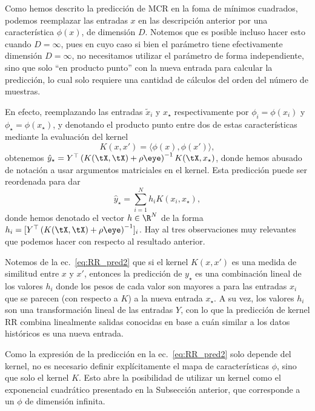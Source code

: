 \begin{remark}
Como hemos descrito la predicción de MCR en la foma de mínimos cuadrados, podemos reemplazar las entradas $x$ en las descripción anterior por una característica $\phi(x)$, de dimensión $D$. Notemos que es posible incluso hacer esto cuando $D=\infty$, pues en cuyo caso si bien el parámetro tiene efectivamente dimensión $D=\infty$, no necesitamos utilizar el parámetro de forma independiente, sino que solo ``en producto punto'' con la nueva entrada para calcular la predicción, lo cual solo requiere una cantidad de cálculos del orden del número de muestras. 
\end{remark}

En efecto, reemplazando las entradas $\tilde{x}_i$ y $x_\star$ respectivamente por $\phi_i=\phi(x_i)$ y $\phi_\star = \phi(x_\star)$, y denotando el producto punto entre dos de estas características mediante la evaluación del kernel 
\begin{equation}
    K(x,x') = \langle \phi(x) , \phi(x') \rangle, 
\end{equation}
obtenemos $\hat{y}_\star    = Y^\top \left(K(\tX,\tX) + \rho\eye\right) ^{-1} K(\tX, x_\star)$, donde hemos abusado de notación a usar argumentos matriciales en el kernel. Esta predicción puede ser reordenada para dar 
\begin{equation}
   \hat{y}_\star    = \sum_{i=1}^N h_i K(x_i,x_\star)\label{eq:RR_pred2},
\end{equation}
donde hemos denotado el vector $h\in\R^N$ de la forma $h_i = [Y^\top \left(K(\tX,\tX) + \rho\eye\right) ^{-1}]_i$. Hay al tres observaciones muy relevantes que podemos hacer con respecto al resultado anterior. 

\begin{remark}[Similitud]
    Notemos de la ec.~\eqref{eq:RR_pred2} que si el kernel $K(x,x')$ es una medida de similitud entre $x$ y $x'$, entonces la predicción de $y_\star$ es una combinación lineal de los valores $h_i$ donde los pesos de cada valor son mayores a para las entradas $x_i$ que se parecen (con respecto a $K$) a la nueva entrada $x_\star$. A su vez, los valores $h_i$ son una transformación lineal de las entradas $Y$, con lo que la predicción de kernel RR combina linealmente salidas conocidas en base a cuán similar a los datos históricos es una nueva entrada. 
\end{remark}

\begin{remark}
Como la expresión de la predicción en la ec.~\eqref{eq:RR_pred2} solo depende del kernel, no es necesario definir explícitamente el mapa de características $\phi$, sino que solo el kernel $K$. Esto abre la posibilidad de utilizar un kernel como el exponencial cuadrático presentado en la Subsección anterior, que corresponde a un $\phi$ de dimensión infinita.
\end{remark}


